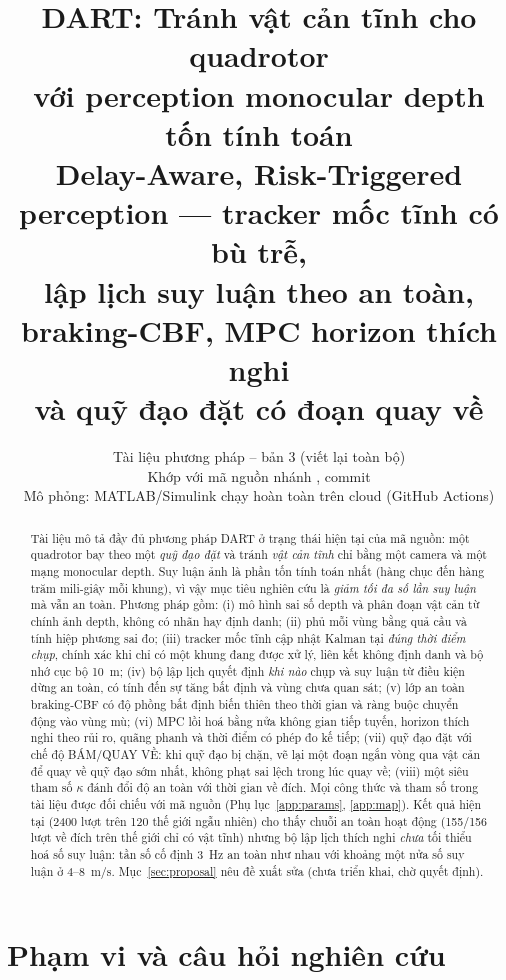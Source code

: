 \documentclass[11pt,a4paper]{article}
\title{\textbf{DART: Tránh vật cản tĩnh cho quadrotor\\ với perception monocular depth tốn tính toán}\\[4pt]
\large Delay-Aware, Risk-Triggered perception --- tracker mốc tĩnh có bù trễ,\\ lập lịch suy luận theo an toàn, braking-CBF, MPC horizon thích nghi\\ và quỹ đạo đặt có đoạn quay về}
\author{Tài liệu phương pháp -- bản 3 (viết lại toàn bộ)\\
Khớp với mã nguồn nhánh \code{claude/serene-bardeen-v1a659}, commit \code{fe652a5}\\
Mô phỏng: MATLAB/Simulink chạy hoàn toàn trên cloud (GitHub Actions)}
\date{}
\numberwithin{equation}{section}
\theoremstyle{definition}
\theoremstyle{plain}
\theoremstyle{remark}
\begin{document}
\maketitle

\begin{abstract}
\noindent
Tài liệu mô tả đầy đủ phương pháp DART ở trạng thái hiện tại của mã nguồn: một quadrotor bay theo một \emph{quỹ đạo đặt} và tránh \emph{vật cản tĩnh} chỉ bằng một camera và một mạng monocular depth. Suy luận ảnh là phần tốn tính toán nhất (hàng chục đến hàng trăm mili-giây mỗi khung), vì vậy mục tiêu nghiên cứu là \emph{giảm tối đa số lần suy luận} mà vẫn an toàn. Phương pháp gồm: (i) mô hình sai số depth và phân đoạn vật cản từ chính ảnh depth, không có nhãn hay định danh; (ii) phủ mỗi vùng bằng quả cầu và tính hiệp phương sai đo; (iii) tracker mốc tĩnh cập nhật Kalman tại \emph{đúng thời điểm chụp}, chính xác khi chỉ có một khung đang được xử lý, liên kết không định danh và bộ nhớ cục bộ 10~m; (iv) bộ lập lịch quyết định \emph{khi nào} chụp và suy luận từ điều kiện dừng an toàn, có tính đến sự tăng bất định và vùng chưa quan sát; (v) lớp an toàn braking-CBF có độ phồng bất định biến thiên theo thời gian và ràng buộc chuyển động vào vùng mù; (vi) MPC lồi hoá bằng nửa không gian tiếp tuyến, horizon thích nghi theo rủi ro, quãng phanh và thời điểm có phép đo kế tiếp; (vii) quỹ đạo đặt với chế độ BÁM/QUAY VỀ: khi quỹ đạo bị chặn, vẽ lại một đoạn ngắn vòng qua vật cản để quay về quỹ đạo sớm nhất, không phạt sai lệch trong lúc quay về; (viii) một siêu tham số $\kappa$ đánh đổi độ an toàn với thời gian về đích. Mọi công thức và tham số trong tài liệu được đối chiếu với mã nguồn (Phụ lục~\ref{app:params}, \ref{app:map}). Kết quả hiện tại (2400 lượt trên 120 thế giới ngẫu nhiên) cho thấy chuỗi an toàn hoạt động (155/156 lượt về đích trên thế giới chỉ có vật tĩnh) nhưng bộ lập lịch thích nghi \emph{chưa} tối thiểu hoá số suy luận: tần số cố định 3~Hz an toàn như nhau với khoảng một nửa số suy luận ở 4--8~m/s. Mục~\ref{sec:proposal} nêu đề xuất sửa (chưa triển khai, chờ quyết định).
\end{abstract}

\tableofcontents
\newpage

\section{Phạm vi và câu hỏi nghiên cứu}
\label{sec:scope}
\end{document}
